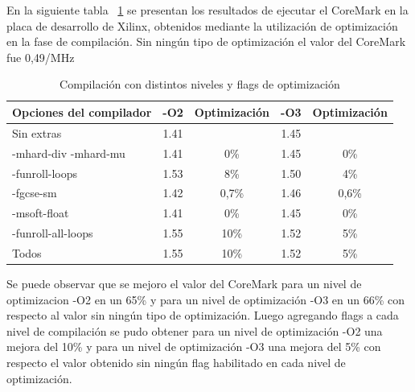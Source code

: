 En la siguiente tabla ~\ref{tab:conbench2} se presentan los resultados de ejecutar el CoreMark en la placa de desarrollo de Xilinx, obtenidos mediante la utilización de optimización en la fase de compilación. Sin ningún tipo de optimización el valor del CoreMark fue 0,49/MHz

\begin{table}[!h]
\begin{center}
\begin{tabular}{ |l |c |c |c |c|}
\hline
\rowcolor[gray]{0.8} Opciones del compilador&-O2& Optimización &-O3& Optimización \\
\hline
Sin extras 					& 1.41 	& 			& 1.45 &  \\
\hline
-mhard-div -mhard-mu 		& 1.41	& 0\%		& 1.45 & 0\% \\
\hline
-funroll-loops			 	& 1.53	& 8\%		& 1.50 & 4\%\\
\hline
-fgcse-sm					& 1.42	& 0,7\%		& 1.46 & 0,6\%\\
\hline
-msoft-float 				& 1.41	& 0\%		& 1.45 & 0\%\\
\hline
-funroll-all-loops	 		& 1.55	& 10\%		& 1.52 & 5\%\\
\hline
Todos	 					& 1.55	& 10\%		& 1.52 & 5\%\\
\hline
\end{tabular}
\end{center}
\caption{Compilación con distintos niveles y flags de optimización}
\label{tab:conbench2}
\end{table}

Se puede observar que se mejoro el valor del CoreMark para un nivel de optimizacion -O2 en un 65\% y para un nivel de optimización -O3 en un 66\% con respecto al valor sin ningún tipo de optimización. Luego agregando flags a cada nivel de compilación se pudo obtener para un nivel de optimización -O2 una mejora del 10\% y para un nivel de optimización -O3 una mejora del 5\%  con respecto el valor obtenido sin ningún flag habilitado en cada nivel de optimización. 


